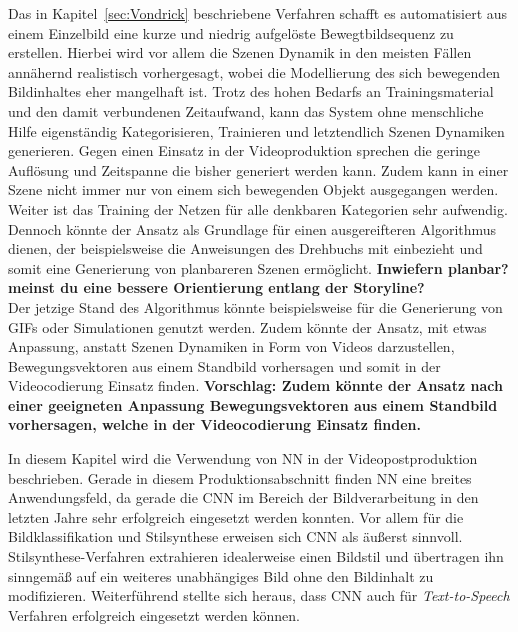 \documentclass[times, 11pt,twocolumn]{article}
\begin{document}
 \label{sec:VondrickConclusion}
Das in Kapitel~\ref{sec:Vondrick} beschriebene Verfahren schafft es automatisiert aus einem Einzelbild eine kurze und niedrig aufgelöste Bewegtbildsequenz zu erstellen. Hierbei wird vor allem die Szenen Dynamik in den meisten Fällen annähernd realistisch vorhergesagt, wobei die Modellierung des sich bewegenden Bildinhaltes eher mangelhaft ist. Trotz des hohen Bedarfs an Trainingsmaterial und den damit verbundenen Zeitaufwand, kann das System ohne menschliche Hilfe eigenständig Kategorisieren, Trainieren und letztendlich Szenen Dynamiken generieren. Gegen einen Einsatz in der Videoproduktion sprechen die geringe Auflösung und Zeitspanne die bisher generiert werden kann. Zudem kann in einer Szene nicht immer nur von einem sich bewegenden Objekt ausgegangen werden. Weiter ist das Training der Netzen für alle denkbaren Kategorien sehr aufwendig. Dennoch könnte der Ansatz als Grundlage für einen ausgereifteren Algorithmus dienen, der beispielsweise die Anweisungen des Drehbuchs mit einbezieht und somit eine Generierung von planbareren Szenen ermöglicht. \textbf{Inwiefern planbar? meinst du eine bessere Orientierung entlang der Storyline?}\\
Der jetzige Stand des Algorithmus könnte beispielsweise für die Generierung von GIFs oder Simulationen genutzt werden. Zudem könnte der Ansatz, mit etwas Anpassung, anstatt Szenen Dynamiken in Form von Videos darzustellen, Bewegungsvektoren aus einem Standbild vorhersagen und somit in der Videocodierung Einsatz finden. \textbf{Vorschlag: Zudem könnte der Ansatz nach einer geeigneten Anpassung Bewegungsvektoren aus einem Standbild vorhersagen, welche in der Videocodierung Einsatz finden.}




 \label{sec:Postroduktion}

In diesem Kapitel wird die Verwendung von NN in der Videopostproduktion beschrieben. Gerade in diesem Produktionsabschnitt finden NN eine breites Anwendungsfeld, da gerade die CNN im Bereich der Bildverarbeitung in den letzten Jahre sehr erfolgreich eingesetzt werden konnten. Vor allem für die Bildklassifikation und Stilsynthese erweisen sich CNN als äußerst sinnvoll. Stilsynthese-Verfahren extrahieren idealerweise einen Bildstil und übertragen ihn sinngemäß auf ein weiteres unabhängiges Bild ohne den Bildinhalt zu modifizieren. Weiterführend stellte sich  heraus, dass CNN auch für \textit{Text-to-Speech} Verfahren erfolgreich eingesetzt werden können.\\
\end{document}
